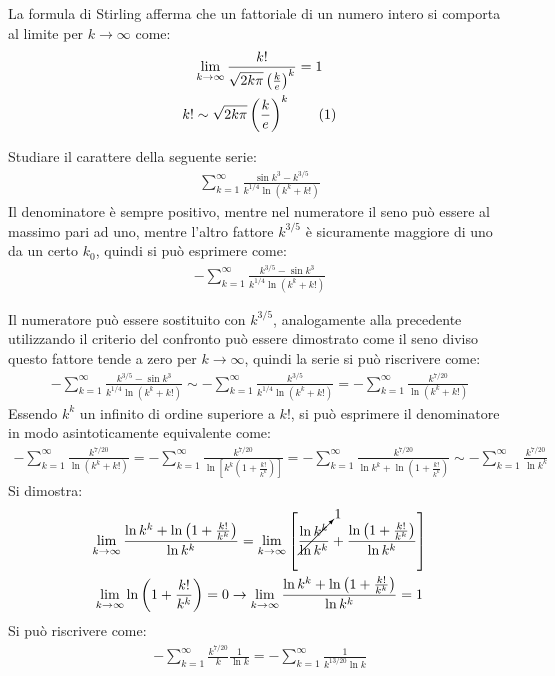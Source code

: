 \documentclass{article}
\numberwithin{equation}{subsection}
\newcommand{\tageq}{\tag{\stepcounter{equation}\theequation}}
\begin{document}

La formula di Stirling afferma che un fattoriale di un numero intero si comporta al limite per $k\to\infty$ come:
\begin{gather*}
    \displaystyle\lim_{k\to\infty}\frac{k!}{\sqrt{2k\pi}\left(\frac{k}{e}\right)^k}=1\\
    k!\sim\sqrt{2k\pi}\left(\frac{k}{e}\right)^k\tageq
\end{gather*}



Studiare il carattere della seguente serie:
\begin{gather*}
    \displaystyle\sum_{k=1}^\infty\frac{\sin k^3-k^{3/5}}{k^{1/4}\ln(k^k+k!)}
\end{gather*}
Il denominatore è sempre positivo, mentre nel numeratore il seno può essere al massimo pari ad uno, mentre l'altro fattore $k^{3/5}$ è sicuramente maggiore di uno da un certo $k_0$, quindi si può esprimere come:
\begin{gather*}
    -\displaystyle\sum_{k=1}^\infty\frac{k^{3/5}-\sin k^3}{k^{1/4}\ln(k^k+k!)}
\end{gather*}

Il numeratore può essere sostituito con $k^{3/5}$, analogamente alla precedente utilizzando il criterio del confronto può essere dimostrato come il seno diviso questo fattore tende a zero per $k\to\infty$, quindi la serie si può riscrivere come:
\begin{gather*}
    -\displaystyle\sum_{k=1}^\infty\frac{k^{3/5}-\sin k^3}{k^{1/4}\ln(k^k+k!)}\sim
    -\displaystyle\sum_{k=1}^\infty\frac{k^{3/5}}{k^{1/4}\ln(k^k+k!)}=
    -\displaystyle\sum_{k=1}^\infty \frac{k^{7/20}}{\ln(k^k+k!)}
\end{gather*}
Essendo $k^k$ un infinito di ordine superiore a $k!$, si può esprimere il denominatore in modo asintoticamente equivalente come:
\begin{gather*}
    -\displaystyle\sum_{k=1}^\infty \frac{k^{7/20}}{\ln(k^k+k!)}=
    -\displaystyle\sum_{k=1}^\infty \frac{k^{7/20}}{\ln\left[k^k\left(1+\frac{k!}{k^k}\right)\right]}=
    -\displaystyle\sum_{k=1}^\infty \frac{k^{7/20}}{\ln k^k+\ln\left(1+\frac{k!}{k^k}\right)}\sim
    -\displaystyle\sum_{k=1}^\infty \frac{k^{7/20}}{\ln k^k}    
\end{gather*}
Si dimostra:
\begin{gather*}
    \lim_{k\to\infty}\frac{\ln k^k+\ln\left(1+\frac{k!}{k^k}\right)}{\ln k^k}=
    \lim_{k\to\infty}\left[\cancelto{1}{\frac{\ln k^k}{\ln k^k}}+\frac{\ln\left(1+\frac{k!}{k^k}\right)}{\ln k^k}\right]\\
    \lim_{k\to\infty}\ln\left(1+\frac{k!}{k^k}\right)=0\rightarrow
    \lim_{k\to\infty}\frac{\ln k^k+\ln\left(1+\frac{k!}{k^k}\right)}{\ln k^k}=1
\end{gather*}
Si può riscrivere come:
\begin{gather*}
    -\displaystyle\sum_{k=1}^\infty\frac{k^{7/20}}{k}\frac{1}{\ln k}=
    -\displaystyle\sum_{k=1}^\infty\frac{1}{k^{13/20}\ln k}
\end{gather*}
\end{document}
